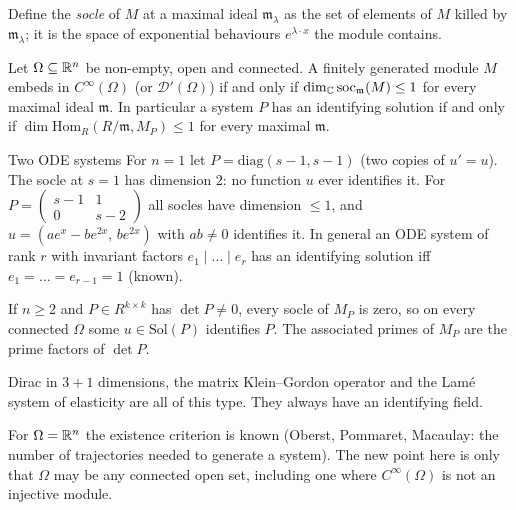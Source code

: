 Define the \emph{socle} of $M$ at a maximal ideal $\mathfrak m_\lambda$ as the set of elements of $M$ killed by $\mathfrak m_\lambda$; it is the space of exponential behaviours $e^{\lambda\cdot x}$ the module contains.

\begin{theorem}\label{thm:sysex}
Let $\Omega\subseteq\mathbb{R}^n$ be non-empty, open and connected. A finitely generated module $M$ embeds in $C^\infty(\Omega)$ (or $\mathcal D'(\Omega)$) if and only if $\dim_{\mathbb{C}}\mathrm{soc}_{\mathfrak m}(M)\le1$ for every maximal ideal $\mathfrak m$. In particular a system $P$ has an identifying solution if and only if $\dim\mathrm{Hom}_R(R/\mathfrak m,M_P)\le1$ for every maximal $\mathfrak m$.
\end{theorem}

\begin{example}{Two ODE systems}
For $n=1$ let $P=\mathrm{diag}(s-1,s-1)$ (two copies of $u'=u$). The socle at $s=1$ has dimension $2$: no function $u$ ever identifies it. For $P=\begin{pmatrix}s-1&1\\0&s-2\end{pmatrix}$ all socles have dimension $\le1$, and $u=(ae^x-be^{2x},\,be^{2x})$ with $ab\ne0$ identifies it. In general an ODE system of rank $r$ with invariant factors $e_1\mid\dots\mid e_r$ has an identifying solution iff $e_1=\dots=e_{r-1}=1$  (known).
\end{example}

\begin{theorem}\label{thm:sysc1}
If $n\ge2$ and $P\in R^{k\times k}$ has $\det P\ne0$, every socle of $M_P$ is zero, so on every connected $\Omega$ some $u\in\mathrm{Sol}(P)$ identifies $P$. The associated primes of $M_P$ are the prime factors of $\det P$.
\end{theorem}

Dirac in $3+1$ dimensions, the matrix Klein--Gordon operator and the Lam\'e system of elasticity are all of this type. They always have an identifying field.

\begin{caution}[title=Where this is not new]
For $\Omega=\mathbb{R}^n$ the existence criterion is known (Oberst, Pommaret, Macaulay: the number of trajectories needed to generate a system). The new point here is only that $\Omega$ may be any connected open set, including one where $C^\infty(\Omega)$ is not an injective module.
\end{caution}

